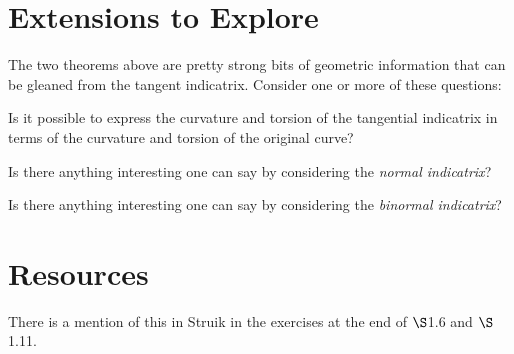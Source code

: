 \documentclass[12pt]{amsart}
\theoremstyle{plain}
\begin{document}
\section*{Extensions to Explore}

The two theorems above are pretty strong bits of geometric information that can be gleaned from the tangent indicatrix. Consider one or more of these questions:
\begin{compactenum}
\item Is it possible to express the curvature and torsion of the tangential indicatrix 
in terms of the curvature and torsion of the original curve?
\item Is there anything interesting one can say by considering the \emph{normal indicatrix}?
\item Is there anything interesting one can say by considering the \emph{binormal indicatrix}?
\end{compactenum}

\section*{Resources}

There is a mention of this in Struik in the exercises at the end of $\S$1.6 and $\S$1.11. 
\end{document}
